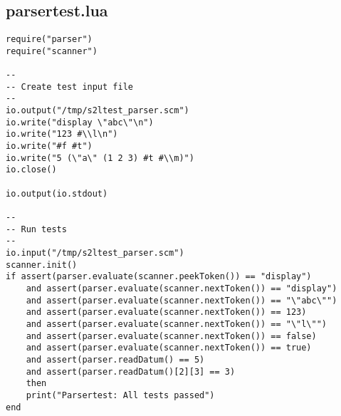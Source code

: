 \subsection{parsertest.lua}
\begin{verbatim}
require("parser")
require("scanner")

--
-- Create test input file
--
io.output("/tmp/s2ltest_parser.scm")
io.write("display \"abc\"\n")
io.write("123 #\\l\n")
io.write("#f #t")
io.write("5 (\"a\" (1 2 3) #t #\\m)")
io.close()

io.output(io.stdout)

--
-- Run tests
--
io.input("/tmp/s2ltest_parser.scm")
scanner.init()
if assert(parser.evaluate(scanner.peekToken()) == "display") 
    and assert(parser.evaluate(scanner.nextToken()) == "display") 
    and assert(parser.evaluate(scanner.nextToken()) == "\"abc\"") 
    and assert(parser.evaluate(scanner.nextToken()) == 123) 
    and assert(parser.evaluate(scanner.nextToken()) == "\"l\"") 
    and assert(parser.evaluate(scanner.nextToken()) == false) 
    and assert(parser.evaluate(scanner.nextToken()) == true) 
    and assert(parser.readDatum() == 5) 
    and assert(parser.readDatum()[2][3] == 3) 
    then
    print("Parsertest: All tests passed")
end
\end{verbatim}

\normalsize
